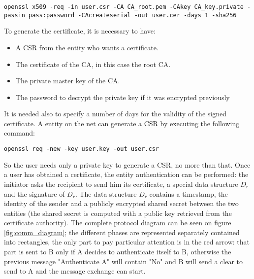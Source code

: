 \documentclass{article}
\begin{document}
\begin{lstlisting}[breaklines]
openssl x509 -req -in user.csr -CA CA_root.pem -CAkey CA_key.private -passin pass:password -CAcreateserial -out user.cer -days 1 -sha256
\end{lstlisting}

To generate the certificate, it is necessary to have: 

\begin{itemize}
	\item A CSR from the entity who wants a certificate.
	\item The certificate of the CA, in this case the root CA.
	\item The private master key of the CA.
	\item The password to decrypt the private key if it was encrypted previously
\end{itemize}

It is needed also to specify a number of days for the validity of the signed certificate.\newline
A entity on the net can generate a CSR by executing the following command:

\begin{lstlisting}[breaklines]
openssl req -new -key user.key -out user.csr
\end{lstlisting}

So the user needs only a private key to generate a CSR, no more than that. Once a user has obtained a certificate, the entity authentication can be performed: the initiator asks the recipient to send him its certificate, a special data structure \textit{$D_r$} and the signature of \textit{$D_r$}. The data structure \textit{$D_r$} contains a timestamp, the identity of the sender and a publicly encrypted shared secret between the two entities (the shared secret is computed with a public key retrieved from the certificate authority).\newline
The complete protocol diagram can be seen on figure \ref{fig:comm_diagram}; the different phases are represented separately contained into rectangles, the only part to pay particular attention is in the red arrow: that part is sent to B only if A decides to authenticate itself to B, otherwise the previous message "Authenticate A" will contain "No" and B will send a clear to send to A and the message exchange can start.
\end{document}
